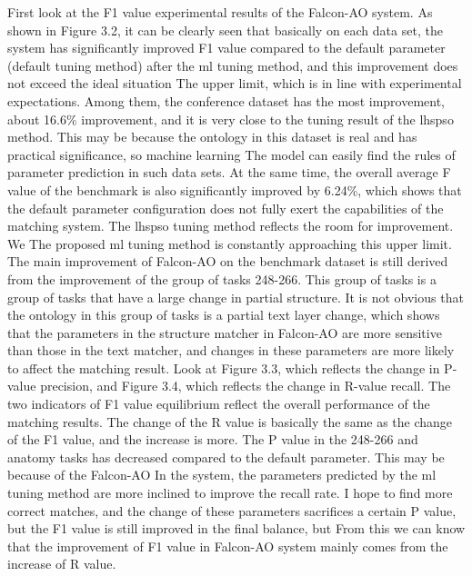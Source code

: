 \documentclass[twoside]{article}
\begin{document}
\begin{multicols}{2}
First look at the F1 value experimental results of the Falcon-AO system. 
As shown in Figure 3.2, it can be clearly seen that basically on each data set, the system has significantly improved F1 value compared to the default parameter (default tuning method) after the ml tuning method, and this improvement does not exceed the ideal situation The upper limit, which is in line with experimental expectations. 
Among them, the conference dataset has the most improvement, about 16.6\% improvement, and it is very close to the tuning result of the lhspso method. This may be because the ontology in this dataset is real and has practical significance, so machine learning The model can easily find the rules of parameter prediction in such data sets. 
At the same time, the overall average F value of the benchmark is also significantly improved by 6.24\%, which shows that the default parameter configuration does not fully exert the capabilities of the matching system. The lhspso tuning method reflects the room for improvement. We The proposed ml tuning method is constantly approaching this upper limit. 
The main improvement of Falcon-AO on the benchmark dataset is still derived from the improvement of the group of tasks 248-266. This group of tasks is a group of tasks that have a large change in partial structure. It is not obvious that the ontology in this group of tasks is a partial text layer change, which shows that the parameters in the structure matcher in Falcon-AO are more sensitive than those in the text matcher, and changes in these parameters are more likely to affect the matching result. Look at Figure 3.3, which reflects the change in P-value precision, and Figure 3.4, which reflects the change in R-value recall. 
The two indicators of F1 value equilibrium reflect the overall performance of the matching results. The change of the R value is basically the same as the change of the F1 value, and the increase is more. The P value in the 248-266 and anatomy tasks has decreased compared to the default parameter. This may be because of the Falcon-AO
In the system, the parameters predicted by the ml tuning method are more inclined to improve the recall rate. I hope to find more correct matches, and the change of these parameters sacrifices a certain P value, but the F1 value is still improved in the final balance, but From this we can know that the improvement of F1 value in Falcon-AO system mainly comes from the increase of R value.


\end{multicols}
\end{document}

